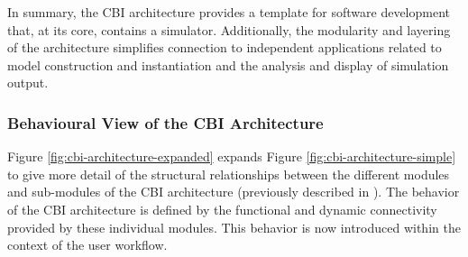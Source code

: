 \documentclass{article}
\begin{document}

In summary, the CBI architecture provides a template for software
development that, at its core, contains a simulator.  Additionally,
the modularity and layering of the architecture simplifies connection
to independent applications related to model construction
and instantiation and the analysis and display of simulation output.

\subsubsection{Behavioural View of the CBI Architecture}

Figure \ref{fig:cbi-architecture-expanded} expands Figure \ref{fig:cbi-architecture-simple} to give more
detail of the structural relationships between the different modules and
sub-modules of the CBI architecture (previously described in \cite{10.1371/journal.pone.0028956}). The behavior of
the CBI architecture is defined by the functional and dynamic
connectivity provided by these individual modules. This behavior is now introduced within the context of the user workflow.
\end{document}
